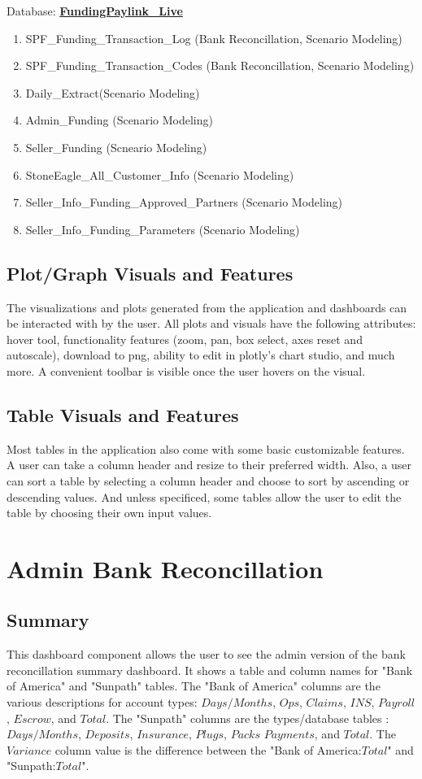 \documentclass[titlepage]{article}
\begin{document}
Database: \underline{\textbf{FundingPaylink\_Live}}
	\begin{enumerate}
		\item SPF\_Funding\_Transaction\_Log (Bank Reconcillation, Scenario Modeling)
		\item SPF\_Funding\_Transaction\_Codes (Bank Reconcillation, Scenario Modeling)
		\item Daily\_Extract(Scenario Modeling)
		\item Admin\_Funding (Scenario Modeling)
		\item Seller\_Funding (Scneario Modeling)
		\item StoneEagle\_All\_Customer\_Info (Scenario Modeling)
		\item Seller\_Info\_Funding\_Approved\_Partners (Scenario Modeling)
		\item Seller\_Info\_Funding\_Parameters (Scenario Modeling)
	\end{enumerate}
	
\subsection{Plot/Graph Visuals and Features}
The visualizations and plots generated from the application and dashboards can be interacted with by the user. All plots and visuals have the following attributes: hover tool, functionality features (zoom, pan, box select, axes reset and autoscale), download to png, ability to edit in plotly's chart studio, and much more. A convenient toolbar is visible once the user hovers on the visual. 

\subsection{Table Visuals and Features}
Most tables in the application also come with some basic customizable features. A user can take a column header and resize to their preferred width. Also, a user can sort a table by selecting a column header and choose to sort by ascending or descending values. And unless specificed, some tables allow the user to edit the table by choosing their own input values. 
\newpage
\section{Admin Bank Reconcillation}
\subsection{Summary}
This dashboard component allows the user to see the admin version of the bank reconcillation summary dashboard. It shows a table and column names for "Bank of America" and "Sunpath" tables. The "Bank of America" columns are the various descriptions for account types: $Days/Months$, $Ops$, $Claims$, $INS$, $Payroll$, $Escrow$, and $Total$. The "Sunpath" columns are the types/database tables : $Days/Months$, $Deposits$, $Insurance$, $Plugs$, $Packs$ $Payments$, and $Total$. The $Variance$ column value is the difference between the "Bank of America:$Total$" and "Sunpath:$Total$".
\end{document}
